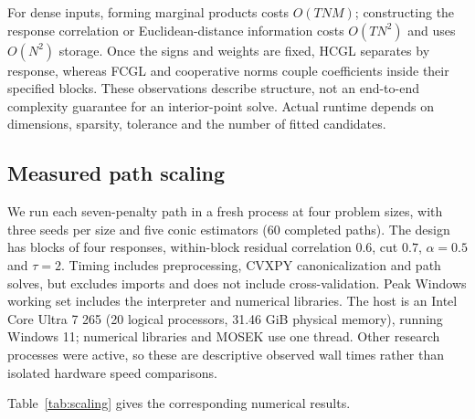 \documentclass[11pt,a4paper]{article}
\begin{document}
For dense inputs, forming marginal products costs $O(TNM)$; constructing the
response correlation or Euclidean-distance information costs $O(TN^2)$ and
uses $O(N^2)$ storage. Once the signs and weights are fixed, HCGL separates
by response, whereas FCGL and cooperative norms couple coefficients inside
their specified blocks. These observations describe structure, not an
end-to-end complexity guarantee for an interior-point solve. Actual runtime
depends on dimensions, sparsity, tolerance and the number of fitted candidates.

\subsection{Measured path scaling}\label{app:scaling}
We run each seven-penalty path in a fresh process at four problem sizes, with
three seeds per size and five conic estimators (60 completed paths). The design
has blocks of four responses, within-block residual correlation $0.6$, cut $0.7$,
$\alpha=0.5$ and $\tau=2$. Timing includes preprocessing, CVXPY canonicalization
and path solves, but excludes imports and does not include cross-validation.
Peak Windows working set includes the interpreter and numerical libraries.
The host is an Intel Core Ultra 7 265 (20 logical processors, 31.46 GiB physical
memory), running Windows 11; numerical libraries and MOSEK use one thread.
Other research processes were active, so these are descriptive observed wall
times rather than isolated hardware speed comparisons.

\noindent Table~\ref{tab:scaling} gives the corresponding numerical results.
\end{document}
